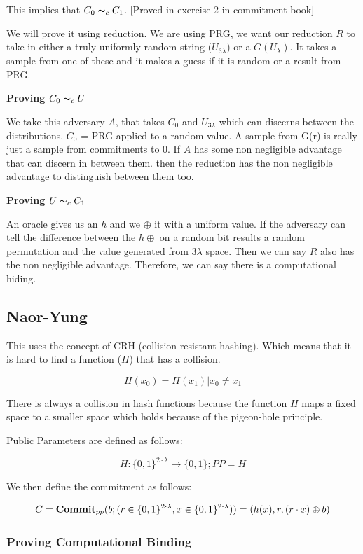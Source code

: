 \documentclass{article}
\begin{document}
This implies that $C_0 \thicksim_c C_1$. [Proved in exercise 2 in commitment book]

We will prove it using reduction. We are using PRG, we want our reduction $R$ to take in either a truly uniformly random string ($U_{3\lambda}$) or a $G(U_{\lambda})$. It takes a sample from one of these and it makes a guess if it is random or a result from PRG.

\textbf{Proving $C_0 \thicksim_c U$}

We take this adversary $A$, that takes $C_0$ and $U_{3\lambda}$ which can discerns between the distributions. $C_0$ = PRG applied to a random value. A sample from G(r) is really just a sample from commitments to $0$. If $A$ has some non negligible advantage that can discern in between them. then the reduction has the non negligible advantage to distinguish between them too.

\textbf{Proving $U \thicksim_c C_1$}

An oracle gives us an $h$ and we $\oplus$ it with a uniform value. If the adversary can tell the difference between the $h \oplus$ on a random bit results a random permutation and the value generated from $3\lambda$ space. Then we can say $R$ also has the non negligible advantage. Therefore, we can say there is a computational hiding.

\subsection{Naor-Yung}

This uses the concept of CRH (collision resistant hashing). Which means that it is hard to find a function ($H$) that has a collision.

$$
H(x_0) = H(x_1) | x_0 \neq x_1
$$

There is always a collision in hash functions because the function $H$ maps a fixed space to a smaller space which holds because of the pigeon-hole principle.

Public Parameters are defined as follows:

$$
H:\{0,1\}^{2\cdot \lambda} \rightarrow \{0,1\}; PP = H
$$

We then define the commitment as follows:

$$
C = \mathbf{Commit}_{pp}(b; (r \in \{0,1\}^{2\cdot \lambda}, x \in \{0,1\}^{2\cdot \lambda})) \\
= (h(x), r, (r \cdot x) \oplus b)
$$

\subsubsection{Proving Computational Binding}
\end{document}
